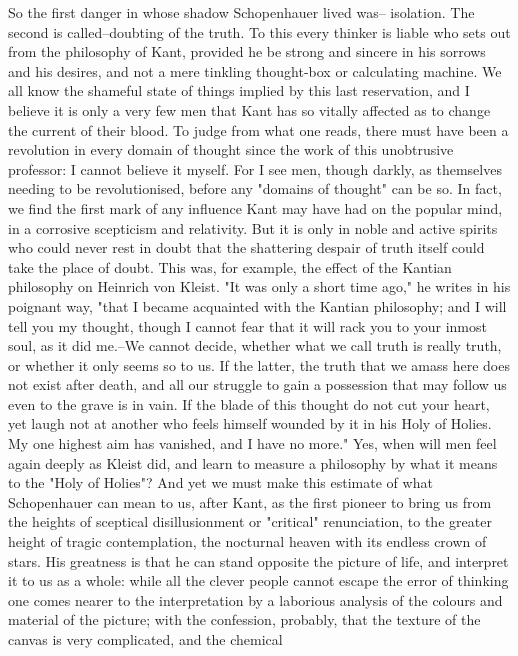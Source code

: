 So the first danger in whose shadow Schopenhauer lived was--
isolation. The second is called--doubting of the truth. To this every
thinker is liable who sets out from the philosophy of Kant, provided
he be strong and sincere in his sorrows and his desires, and not a
mere tinkling thought-box or calculating machine. We all know the
shameful state of things implied by this last reservation, and I
believe it is only a very few men that Kant has so vitally affected
as to change the current of their blood. To judge from what one
reads, there must have been a revolution in every domain of thought
since the work of this unobtrusive professor: I cannot believe it
myself. For I see men, though darkly, as themselves needing to be
revolutionised, before any "domains of thought" can be so. In fact,
we find the first mark of any influence Kant may have had on the
popular mind, in a corrosive scepticism and relativity. But it is
only in noble and active spirits who could never rest in doubt that
the shattering despair of truth itself could take the place of doubt.
This was, for example, the effect of the Kantian philosophy on
Heinrich von Kleist. "It was only a short time ago," he writes in his
poignant way, "that I became acquainted with the Kantian philosophy;
and I will tell you my thought, though I cannot fear that it will
rack you to your inmost soul, as it did me.--We cannot decide,
whether what we call truth is really truth, or whether it only seems
so to us. If the latter, the truth that we amass here does not exist
after death, and all our struggle to gain a possession that may
follow us even to the grave is in vain. If the blade of this thought
do not cut your heart, yet laugh not at another who feels himself
wounded by it in his Holy of Holies. My one highest aim has vanished,
and I have no more." Yes, when will men feel again deeply as Kleist
did, and learn to measure a philosophy by what it means to the "Holy
of Holies"? And yet we must make this estimate of what Schopenhauer
can mean to us, after Kant, as the first pioneer to bring us from the
heights of sceptical disillusionment or "critical" renunciation, to
the greater height of tragic contemplation, the nocturnal heaven with
its endless crown of stars. His greatness is that he can stand
opposite the picture of life, and interpret it to us as a whole:
while all the clever people cannot escape the error of thinking one
comes nearer to the interpretation by a laborious analysis of the
colours and material of the picture; with the confession, probably,
that the texture of the canvas is very complicated, and the chemical
